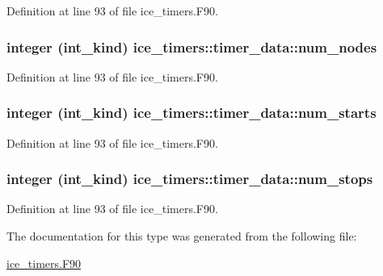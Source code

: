 Definition at line 93 of file ice\_\-timers.F90.\hypertarget{typeice__timers_1_1timer__data_a385b3c0a0659627b2a96b6fa6c43c96b}{
\subsubsection[{num\_\-nodes}]{\setlength{\rightskip}{0pt plus 5cm}integer (int\_\-kind) {\bf ice\_\-timers::timer\_\-data::num\_\-nodes}}}
\label{typeice__timers_1_1timer__data_a385b3c0a0659627b2a96b6fa6c43c96b}


Definition at line 93 of file ice\_\-timers.F90.\hypertarget{typeice__timers_1_1timer__data_a20d814cd89954fa3d7ce9efe689f8ecd}{
\subsubsection[{num\_\-starts}]{\setlength{\rightskip}{0pt plus 5cm}integer (int\_\-kind) {\bf ice\_\-timers::timer\_\-data::num\_\-starts}}}
\label{typeice__timers_1_1timer__data_a20d814cd89954fa3d7ce9efe689f8ecd}


Definition at line 93 of file ice\_\-timers.F90.\hypertarget{typeice__timers_1_1timer__data_a54fa47c05faa9066e575d3a93b495c70}{
\subsubsection[{num\_\-stops}]{\setlength{\rightskip}{0pt plus 5cm}integer (int\_\-kind) {\bf ice\_\-timers::timer\_\-data::num\_\-stops}}}
\label{typeice__timers_1_1timer__data_a54fa47c05faa9066e575d3a93b495c70}


Definition at line 93 of file ice\_\-timers.F90.

The documentation for this type was generated from the following file:\begin{DoxyCompactItemize}
\item 
\hyperlink{ice__timers_8F90}{ice\_\-timers.F90}\end{DoxyCompactItemize}
